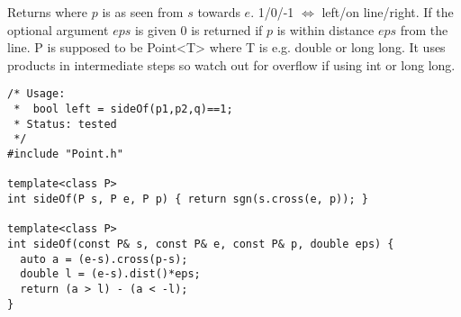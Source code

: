Returns where $p$ is as seen from $s$ towards $e$. 1/0/-1 $\Leftrightarrow$ left/on line/right. If the optional argument $eps$ is given 0 is returned if $p$ is within distance $eps$ from the line. P is supposed to be Point<T> where T is e.g. double or long long. It uses products in intermediate steps so watch out for overflow if using int or long long.
\begin{verbatim}
/* Usage:
 *  bool left = sideOf(p1,p2,q)==1;
 * Status: tested
 */
#include "Point.h"

template<class P>
int sideOf(P s, P e, P p) { return sgn(s.cross(e, p)); }

template<class P>
int sideOf(const P& s, const P& e, const P& p, double eps) {
  auto a = (e-s).cross(p-s);
  double l = (e-s).dist()*eps;
  return (a > l) - (a < -l);
}
\end{verbatim}
